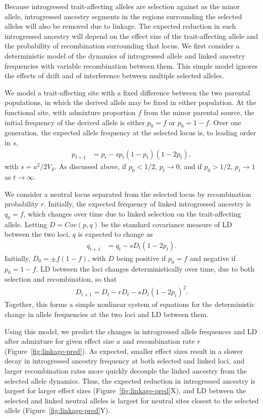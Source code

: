 \documentclass{article}
\begin{document}
Because introgressed trait-affecting alleles are selection against as the minor
allele, introgressed ancestry segments in the regions surrounding the selected
alleles will also be removed due to linkage. The expected reduction in such
introgressed ancestry will depend on the effect size of the trait-affecting
allele and the probability of recombination surrounding that locus. We first
consider a deterministic model of the dynamics of introgressed allele and
linked ancestry frequencies with variable recombination between them. This
simple model ignores the effects of drift and of interference between multiple
selected alleles.

We model a trait-affecting site with a fixed difference between the two
parental populations, in which the derived allele may be fixed in either
population. At the functional site, with admixture proportion $f$ from the
minor parental source, the initial frequency of the derived allele is either
$p_0=f$ or $p_0=1-f$. Over one generation, the expected allele frequency at the
selected locus is, to leading order in $s$,
\begin{align}\label{eq:system-p}
    p_{t+1} & = p_t - s p_t(1-p_t)(1-2p_t),
\end{align}
with
\(s=a^2/2V_S\). As discussed above, if \(p_0<1/2\), \(p_t\rightarrow0\), and if
\(p_0>1/2\), \(p_t\rightarrow1\) as \(t\rightarrow\infty\).

We consider a neutral locus separated from the selected locus by recombination
probability $r$. Initially, the expected frequency of linked introgressed
ancestry is \(q_0=f\), which changes over time due to linked selection on the
trait-affecting allele. Letting \(D=Cov(p,q)\) be the standard covariance
measure of LD between the two loci, $q$ is expected to change as
\begin{align}\label{eq:system-q}
    q_{t+1} & = q_t - s D_t(1-2p_t).
\end{align}
Initially, \(D_0=\pm f(1-f)\), with \(D\) being
positive if \(p_0=f\) and negative if \(p_0=1-f\). LD between the loci changes
deterministically over time, due to both selection and recombination, so that
\begin{align}\label{eq:system-D}
    D_{t+1} = D_t - r D_t - s D_t (1-2p_t)^2.
\end{align}
Together, this forms a
simple nonlinear system of equations for the deterministic change in allele
frequencies at the two loci and LD between them.

Using this model, we predict the changes in introgressed allele frequences and
LD after admixture for given effect size $a$ and recombination rate $r$
(Figure~\ref{fig:linkage-pred}). As expected, smaller effect sizes result in a
slower decay in introgressed ancestry frequency at both selected and linked
loci, and larger recombination rates more quickly decouple the linked ancestry
from the selected allele dynamics. Thus, the expected reduction in introgressed
ancestry is largest for larger effect sizes (Figure~\ref{fig:linkage-pred}X),
and LD between the selected and linked neutral alleles is largest for neutral
sites closest to the selected allele (Figure~\ref{fig:linkage-pred}Y).
\end{document}
